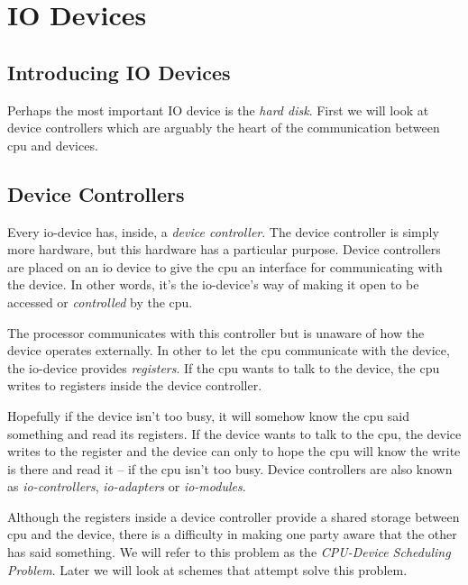 

\chapter{IO Devices}


\section{Introducing IO Devices}


Perhaps the most important IO device is the \textit{hard disk}. 
First we will look at device controllers which are arguably the heart of the
communication between cpu and devices. 

\section{Device Controllers}

Every io-device has, inside, a \textit{device controller}.  
The device controller is simply more hardware, but this hardware has a particular purpose. 
Device controllers are placed on an io device to give the cpu an interface for communicating
with the device. In other words, it’s the io-device’s way of making it open to be 
accessed or \textit{controlled} by the cpu. 

The processor communicates with this controller but is unaware of how the device 
operates externally.
In other to let the cpu communicate with the device, the io-device provides 
\textit{registers}. If the cpu wants to talk to the device, the cpu writes 
to registers inside the device controller. 

Hopefully if the device isn’t too busy, it will somehow know the cpu said something and read its
registers. If the device wants to talk to the cpu, the device writes to the register and the
device can only to hope the cpu will know the write is there and read it – if the cpu isn’t too busy. 
Device controllers are also known as \textit{io-controllers}, 
\textit{io-adapters} or \textit{io-modules}. 

Although the registers inside a device controller provide a shared storage between cpu 
and the device, there is a difficulty in making one party aware that the other has said 
something. We will refer to this problem as the \textit{CPU-Device Scheduling Problem}. 
Later we will look at schemes that attempt solve this problem.

